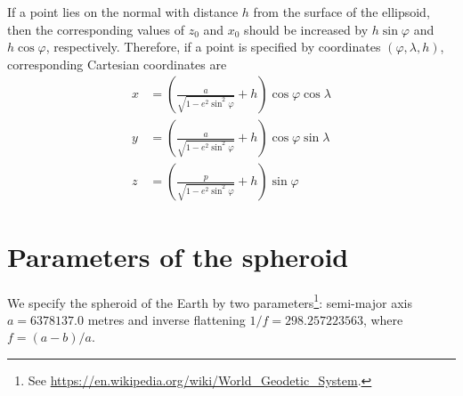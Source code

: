 If a point lies on the normal with distance $h$ from the surface of
the ellipsoid, then the corresponding values of $z_0$ and $x_0$ should
be increased by $h \sin \varphi$ and $h \cos \varphi$, respectively.
Therefore, if a point is specified by coordinates $(\varphi, \lambda,
h)$, corresponding Cartesian coordinates are
\begin{align}
  \label{eq:x_coord}
  x &= \left( \frac{a}{\sqrt{1 - e^2\sin^2 \varphi}} + h \right) \cos
  \varphi \cos \lambda \\
  \label{eq:y_coord}
  y &= \left( \frac{a}{\sqrt{1 - e^2\sin^2 \varphi}} + h \right) \cos
  \varphi \sin \lambda \\
  \label{eq:z_coord}
  z &= \left( \frac{p}{\sqrt{1 - e^2\sin^2 \varphi}} + h \right) \sin
  \varphi
\end{align}

\section{Parameters of the spheroid}

We specify the spheroid of the Earth by two parameters\footnote{See
  \url{https://en.wikipedia.org/wiki/World_Geodetic_System}.}:
semi-major axis $a = 6378137.0$ metres and inverse flattening $1 / f =
298.257223563$, where $f = (a - b) / a$.
